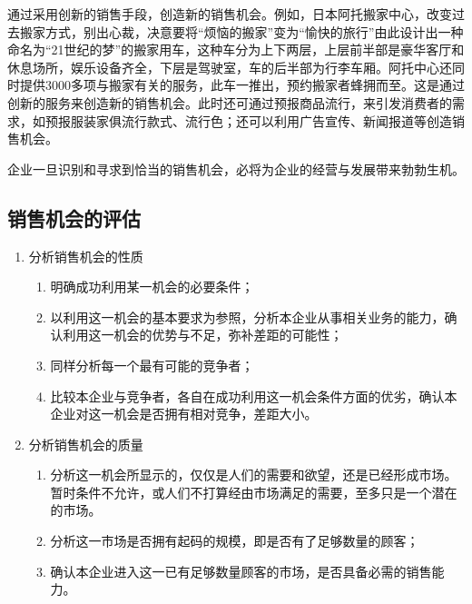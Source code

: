     通过采用创新的销售手段，创造新的销售机会。例如，日本阿托搬家中心，改变过去搬家方式，别出心裁，决意要将“烦恼的搬家”变为“愉快的旅行”由此设计出一种命名为“21世纪的梦”的搬家用车，这种车分为上下两层，上层前半部是豪华客厅和休息场所，娱乐设备齐全，下层是驾驶室，车的后半部为行李车厢。阿托中心还同时提供3000多项与搬家有关的服务，此车一推出，预约搬家者蜂拥而至。这是通过创新的服务来创造新的销售机会。此时还可通过预报商品流行，来引发消费者的需求，如预报服装家俱流行款式、流行色；还可以利用广告宣传、新闻报道等创造销售机会。

    企业一旦识别和寻求到恰当的销售机会，必将为企业的经营与发展带来勃勃生机。

\subsection {销售机会的评估}

\begin{enumerate}
    \item 分析销售机会的性质
        \begin{enumerate}
            \item 明确成功利用某一机会的必要条件；
            \item 以利用这一机会的基本要求为参照，分析本企业从事相关业务的能力，确认利用这一机会的优势与不足，弥补差距的可能性；
            \item 同样分析每一个最有可能的竞争者；
            \item 比较本企业与竞争者，各自在成功利用这一机会条件方面的优劣，确认本企业对这一机会是否拥有相对竞争，差距大小。
        \end{enumerate}

    \item 分析销售机会的质量

        \begin{enumerate}
            \item 分析这一机会所显示的，仅仅是人们的需要和欲望，还是已经形成市场。暂时条件不允许，或人们不打算经由市场满足的需要，至多只是一个潜在的市场。
            \item 分析这一市场是否拥有起码的规模，即是否有了足够数量的顾客；
            \item 确认本企业进入这一已有足够数量顾客的市场，是否具备必需的销售能力。
        \end{enumerate}
\end{enumerate}
